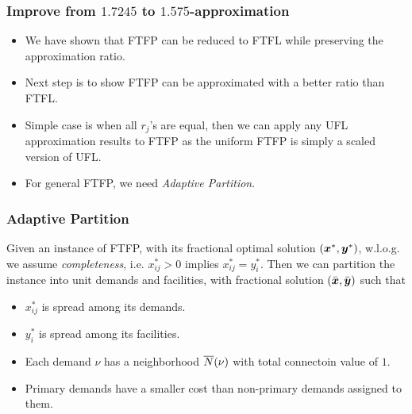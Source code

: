 \documentclass[handout, hyperref, xcolor=dvipsnames]{beamer}
\begin{document}
\begin{frame}
  \frametitle{Improve from $1.7245$ to $1.575$-approximation}
  \begin{itemize}
  \item We have shown that FTFP can be reduced to FTFL while
    preserving the approximation ratio.
  \item Next step is to show FTFP can be approximated with a better
    ratio than FTFL.
  \item Simple case is when all $r_j$'s are equal, then we can apply
    any UFL approximation results to FTFP as the uniform FTFP is
    simply a scaled version of UFL.
  \item For general FTFP, we need \emph{Adaptive Partition}.
  \end{itemize}
\end{frame}

\begin{frame}
  \frametitle{Adaptive Partition} 

  Given an instance of FTFP, with its fractional optimal solution
  $(\boldsymbol{x}^\ast, \boldsymbol{y}^\ast)$, w.l.o.g. we assume \emph{completeness},
  i.e. $x_{ij}^\ast > 0$ implies $x_{ij} ^\ast = y_i^\ast$.  Then we
  can partition the instance into unit demands and facilities, with
  fractional solution $(\bar{\boldsymbol{x}}, \bar{\boldsymbol{y}})$ such that
  \begin{itemize}
  \item $x_{ij}^\ast$ is spread among its demands.
  \item $y_i^\ast$ is spread among its facilities.
  \item Each demand $\nu$ has a neighborhood ${\overline{N}}(\nu)$ with total
    connectoin value of $1$.
  \item Primary demands have a smaller cost than non-primary demands
    assigned to them.
  \end{itemize}
\end{frame}
\end{document}
